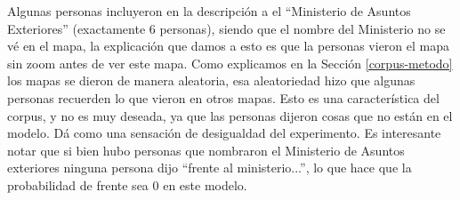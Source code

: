 
Algunas personas incluyeron en la descripci\'on a el ``Ministerio de Asuntos Exteriores'' (exactamente 6 personas), siendo que el nombre del Ministerio no se v\'e en el mapa, la explicaci\'on que damos a esto es que la personas vieron el mapa sin zoom antes de ver este mapa. Como explicamos en la Secci\'on \ref{corpus-metodo} los mapas se dieron de manera aleatoria, esa aleatoriedad hizo que algunas personas recuerden lo que vieron en otros mapas. Esto es una caracter\'istica del corpus, y no es muy deseada, ya que las personas dijeron cosas que no est\'an en el modelo. D\'a como una sensaci\'on de desigualdad del experimento.
Es interesante notar que si bien hubo personas que nombraron el Ministerio de Asuntos exteriores ninguna persona dijo ``frente al ministerio...'', lo que hace que la probabilidad de frente sea 0 en este modelo.


